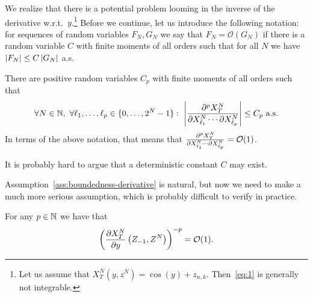 We realize that there is a potential problem looming in the inverse of the
derivative w.r.t.~$y$.\footnote{Let us assume that
  $X^N_T(y,z^N) = \cos(y) + z_{n,k}$. Then~\eqref{eq:1} is generally not
  integrable.} Before we continue, let us introduce the following notation:
for sequences of random variables $F_N, G_N$ we say that
$F_N = \mathcal{O}(G_N)$ if there is a random variable $C$ with finite moments
of all orders such that for all $N$ we have $\left\lvert F_N\right\rvert \le C \left\lvert G_N\right\rvert$ a.s.

\begin{assumption}
  \label{ass:boundedness-derivative}
  There are positive random variables $C_p$ with finite moments of all orders
  such that
  \begin{equation*}
    \forall N \in \mathbb{N},\ \forall \ell_1, \ldots, \ell_p \in \{0, \ldots, 2^N-1\}:\ \left\lvert\frac{\partial^p
        X^N_T}{\partial X^N_{\ell_1} \cdots \partial X^N_{\ell_p}}\right\rvert \le C_p \text{ a.s.}
  \end{equation*}
  In terms of the above notation, that means that $\frac{\partial^p X^N_T}{\partial
    X^N_{\ell_1} \cdots \partial X^N_{\ell_p}} = \mathcal{O}(1)$.
\end{assumption}

\begin{remark}
  It is probably hard to argue that a deterministic constant $C$ may exist.
\end{remark}

Assumption~\ref{ass:boundedness-derivative} is natural, but now we need to
make a much more serious assumption, which is probably difficult to verify in
practice.

\begin{assumption}
  \label{ass:boundedness-inverse}
  For any $p \in \mathbb{N}$ we have that
  \begin{equation*}
    \left( \frac{\partial X^N_T}{\partial y}\left( Z_{-1}, Z^N \right) \right)^{-p} = \mathcal{O}(1).
  \end{equation*}
\end{assumption}

